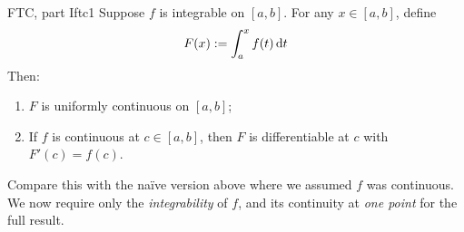 \begin{thm}{FTC, part I}{ftc1}
	Suppose $f$ is integrable on $[a,b]$. For any $x\in[a,b]$, define
	\[
		F(x):=\int_a^xf(t)\,{\mathrm{d} t}
	\]
	Then:
	\begin{enumerate}
	  \item $F$ is uniformly continuous on $[a,b]$;
	  \item If $f$ is continuous at $c\in[a,b]$, then $F$ is differentiable\footnotemark{} at $c$ with $F'(c)=f(c)$.
	\end{enumerate}
\end{thm}


Compare this with the naïve version above where we assumed $f$ was continuous. We now require only the \emph{integrability} of $f$, and its continuity at \emph{one point} for the full result.


\goodbreak


